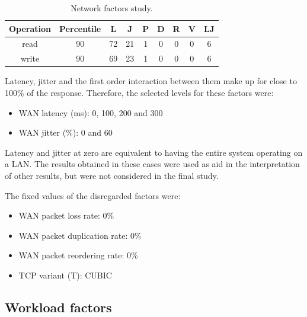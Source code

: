 \documentclass[doublespacing]{bmcart}
\begin{document}
\begin{table}[h!] 
\caption{Network factors study.} \label{tab:estudo_para_fatores_de_rede}
\begin{tabular}{ccccccccc} \hline

Operation & Percentile & L & J & P & D & R & V & LJ\\\hline

read & 90 & 72 & 21 & 1 & 0 & 0 & 0 & 6\\

write & 90 & 69 & 23 & 1 & 0 & 0 & 0 & 6\\\hline

\end{tabular}

\end{table}

Latency, jitter and the first order interaction between them make up for close to 100\% of the response. Therefore, the selected levels for
these factors were:

\begin{itemize}

\item WAN latency (ms): 0, 100, 200 and 300

\item WAN jitter (\%): 0 and 60

\end{itemize}

Latency and jitter at zero are equivalent to having the entire system operating
on a LAN. The results obtained in these cases were used as aid in the
interpretation of other results, but were not considered in the final study.

The fixed values of the disregarded factors were:

\begin{itemize}

\item WAN packet loss rate: 0\%

\item WAN packet duplication rate: 0\%

\item WAN packet reordering rate: 0\%

\item TCP variant (T): CUBIC

\end{itemize}

\subsection{Workload factors}
\end{document}
